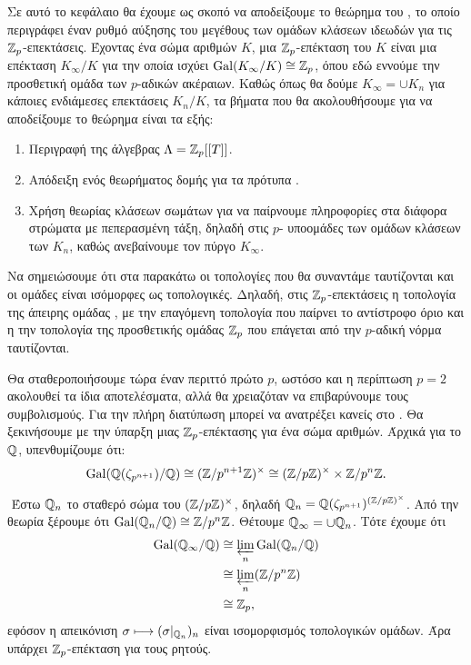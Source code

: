 
Σε αυτό το κεφάλαιο θα έχουμε ως σκοπό να αποδείξουμε το θεώρημα του , το οποίο 
περιγράφει έναν ρυθμό αύξησης του μεγέθους των ομάδων κλάσεων ιδεωδών για τις $\mathbb{Z}_p$-επεκτάσεις. 
Έχοντας ένα σώμα αριθμών $K$, μια $\mathbb{Z}_p$-επέκταση του $K$ είναι μια επέκταση $K_{\infty}/K$ για την οποία ισχύει 
$\operatorname{Gal}(K_\infty/K)\cong \mathbb{Z}_p$, όπου εδώ εννούμε την προσθετική ομάδα των $p$-αδικών ακέραιων. Καθώς όπως θα δούμε 
$K_\infty = \cup K_n$ για κάποιες ενδιάμεσες επεκτάσεις $K_n/K$, τα βήματα που θα ακολουθήσουμε για να αποδείξουμε το θεώρημα είναι τα εξής:
\begin{enumerate}
	\item Περιγραφή της άλγεβρας  $ \Lambda = \mathbb{Z}_p[[T]]$.
	\item Απόδειξη ενός θεωρήματος δομής για τα πρότυπα .
	\item Χρήση θεωρίας κλάσεων σωμάτων για να παίρνουμε πληροφορίες στα διάφορα στρώματα με πεπερασμένη τάξη, δηλαδή στις $p$- υποομάδες των ομάδων κλάσεων των $K_n$, καθώς ανεβαίνουμε τον πύργο $K_\infty$.
\end{enumerate}

\noindent Να σημειώσουμε ότι στα παρακάτω οι τοπολογίες που θα συναντάμε ταυτίζονται και οι ομάδες είναι ισόμορφες ως τοπολογικές. 
Δηλαδή, στις $\mathbb{Z}_p$-επεκτάσεις η τοπολογία  της άπειρης ομάδας , με την επαγόμενη τοπολογία που παίρνει 
το αντίστροφο όριο και η την τοπολογία της προσθετικής ομάδας $\mathbb{Z}_p$ που επάγεται από την $p$-αδική νόρμα ταυτίζονται.

Θα σταθεροποιήσουμε τώρα έναν περιττό πρώτο $p$, ωστόσο και η περίπτωση $p=2$ ακολουθεί τα ίδια αποτελέσματα, αλλά θα χρειαζόταν να επιβαρύνουμε 
τους συμβολισμούς. Για την πλήρη διατύπωση μπορεί να ανατρέξει κανείς στο \cite{Wash}. Θα ξεκινήσουμε με την ύπαρξη μιας $\mathbb{Z}_p$-επέκτασης για ένα σώμα αριθμών. Άρχικά για το $\mathbb{Q}$, υπενθυμίζουμε ότι:
$$\operatorname{Gal}(\mathbb{Q}(\zeta_{p^{n+1}})/\mathbb{Q}) \cong (\mathbb{Z}/p^{n+1}\mathbb{Z})^\times \cong (\mathbb{Z}/p\mathbb{Z})^\times \times \mathbb{Z}/p^n\mathbb{Z}.$$

$ $\newline
Έστω $\mathbb{Q}_n$ το σταθερό σώμα του $(\mathbb{Z}/p\mathbb{Z})^\times$, δηλαδή $\mathbb{Q}_n = \mathbb{Q}(\zeta_{p^{n+1}})^{(\mathbb{Z}/p\mathbb{Z})^\times}$. Από την θεωρία  ξέρουμε ότι $\operatorname{Gal}(\mathbb{Q}_n/\mathbb{Q})\cong \mathbb{Z}/p^n\mathbb{Z}$. Θέτουμε $\mathbb{Q}_\infty = \cup \mathbb{Q}_n$. Τότε έχουμε ότι
\begin{align*}
	\Gal(\Q_\infty/\Q) %
	&\cong  \varprojlim_n \Gal(\Q_n/\Q)\\
	&\cong \varprojlim_n (\Z/p^n\Z) \\
	&\cong \Z_p ,
\end{align*}
εφόσον η απεικόνιση $\sigma \longmapsto (\sigma|_{\mathbb{Q}_n})_n$ είναι ισομορφισμός τοπολογικών ομάδων. Άρα υπάρχει $\mathbb{Z}_p$-επέκταση για τους ρητούς.

